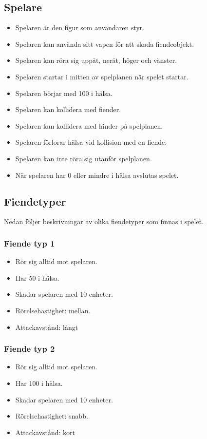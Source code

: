 \documentclass{TDP005mall}
\begin{document}
  \subsection{Spelare}
  \begin{itemize}
    \item Spelaren är den figur som användaren styr.
    \item Spelaren kan använda sitt vapen för att skada fiendeobjekt.
    \item Spelaren kan röra sig uppåt, neråt, höger och vänster.
    \item Spelaren startar i mitten av spelplanen när spelet startar.
    \item Spelaren börjar med 100 i hälsa.
    \item Spelaren kan kollidera med fiender.
    \item Spelaren kan kollidera med hinder på spelplanen.
    \item Spelaren förlorar hälsa vid kollision med en fiende.
    \item Spelaren kan inte röra sig utanför spelplanen.
    \item När spelaren har 0 eller mindre i hälsa avslutas spelet.
  \end{itemize}


  \subsection{Fiendetyper}
  Nedan följer beskrivningar av olika fiendetyper som finnas i spelet.
  \subsubsection{Fiende typ 1}
  \begin{itemize}
    \item Rör sig alltid mot spelaren.
    \item Har 50 i hälsa.
    \item Skadar spelaren med 10 enheter.
    \item Rörelsehastighet: mellan.
    \item Attackavstånd: långt
  \end{itemize}

  \subsubsection{Fiende typ 2}
  \begin{itemize}
    \item Rör sig alltid mot spelaren.
    \item Har 100 i hälsa.
    \item Skadar spelaren med 10 enheter.
    \item Rörelsehastighet: snabb.
    \item Attackavstånd: kort
  \end{itemize}
\end{document}
